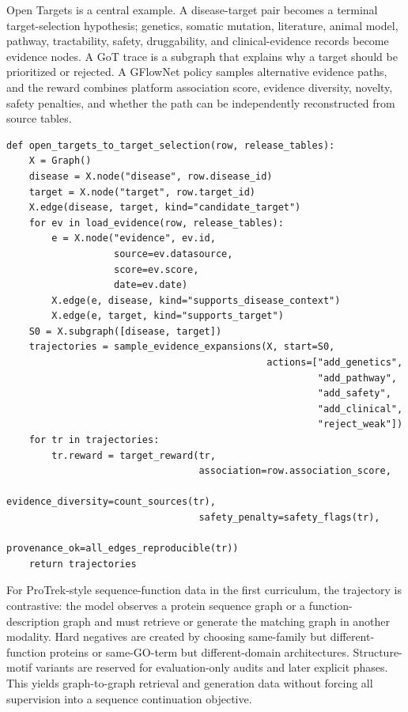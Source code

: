 \documentclass[11pt]{article}
\newcommand{\1}{\mathbf{1}}
\begin{document}
Open Targets is a central example. A disease-target pair becomes a terminal target-selection hypothesis; genetics, somatic mutation, literature, animal model, pathway, tractability, safety, druggability, and clinical-evidence records become evidence nodes. A GoT trace is a subgraph that explains why a target should be prioritized or rejected. A GFlowNet policy samples alternative evidence paths, and the reward combines platform association score, evidence diversity, novelty, safety penalties, and whether the path can be independently reconstructed from source tables.

\begin{lstlisting}[caption={Open Targets disease-target evidence graph to GoT/GFlowNet trajectory.}]
def open_targets_to_target_selection(row, release_tables):
    X = Graph()
    disease = X.node("disease", row.disease_id)
    target = X.node("target", row.target_id)
    X.edge(disease, target, kind="candidate_target")
    for ev in load_evidence(row, release_tables):
        e = X.node("evidence", ev.id,
                   source=ev.datasource,
                   score=ev.score,
                   date=ev.date)
        X.edge(e, disease, kind="supports_disease_context")
        X.edge(e, target, kind="supports_target")
    S0 = X.subgraph([disease, target])
    trajectories = sample_evidence_expansions(X, start=S0,
                                              actions=["add_genetics",
                                                       "add_pathway",
                                                       "add_safety",
                                                       "add_clinical",
                                                       "reject_weak"])
    for tr in trajectories:
        tr.reward = target_reward(tr,
                                  association=row.association_score,
                                  evidence_diversity=count_sources(tr),
                                  safety_penalty=safety_flags(tr),
                                  provenance_ok=all_edges_reproducible(tr))
    return trajectories
\end{lstlisting}

For ProTrek-style sequence-function data in the first curriculum, the trajectory is contrastive: the model observes a protein sequence graph or a function-description graph and must retrieve or generate the matching graph in another modality. Hard negatives are created by choosing same-family but different-function proteins or same-GO-term but different-domain architectures. Structure-motif variants are reserved for evaluation-only audits and later explicit phases. This yields graph-to-graph retrieval and generation data without forcing all supervision into a sequence continuation objective.
\end{document}
